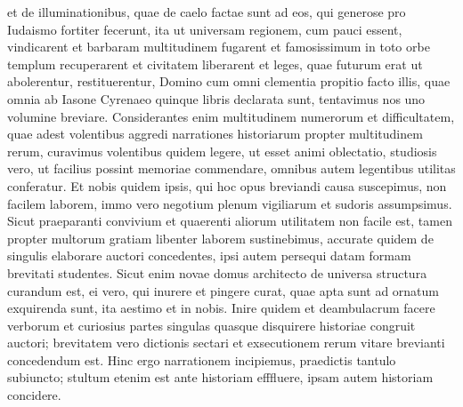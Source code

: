\begin{biblechapter}
\verse et de illuminationibus, quae de caelo factae sunt ad eos, qui generose pro Iudaismo fortiter fecerunt, ita ut universam regionem, cum pauci essent, vindicarent et barbaram multitudinem fugarent 
\verse et famosissimum in toto orbe templum recuperarent et civitatem liberarent et leges, quae futurum erat ut abolerentur, restituerentur, Domino cum omni clementia propitio facto illis, 
\verse quae omnia ab Iasone Cyrenaeo quinque libris declarata sunt, tentavimus nos uno volumine breviare. 
\verse Considerantes enim multitudinem numerorum et difficultatem, quae adest volentibus aggredi narrationes historiarum propter multitudinem rerum, 
\verse curavimus volentibus quidem legere, ut esset animi oblectatio, studiosis vero, ut facilius possint memoriae commendare, omnibus autem legentibus utilitas conferatur. 
\verse Et nobis quidem ipsis, qui hoc opus breviandi causa suscepimus, non facilem laborem, immo vero negotium plenum vigiliarum et sudoris assumpsimus. 
\verse Sicut praeparanti convivium et quaerenti aliorum utilitatem non facile est, tamen propter multorum gratiam libenter laborem sustinebimus,  
\verse accurate quidem de singulis elaborare auctori concedentes, ipsi autem persequi datam formam brevitati studentes. 
\verse Sicut enim novae domus architecto de universa structura curandum est, ei vero, qui inurere et pingere curat, quae apta sunt ad ornatum exquirenda sunt, ita aestimo et in nobis.  
\verse Inire quidem et deambulacrum facere verborum et curiosius partes singulas quasque disquirere historiae congruit auctori; 
\verse brevitatem vero dictionis sectari et exsecutionem rerum vitare brevianti concedendum est. 
\verse Hinc ergo narrationem incipiemus, praedictis tantulo subiuncto; stultum etenim est ante historiam efffluere, ipsam autem historiam concidere. 
\end{biblechapter}

